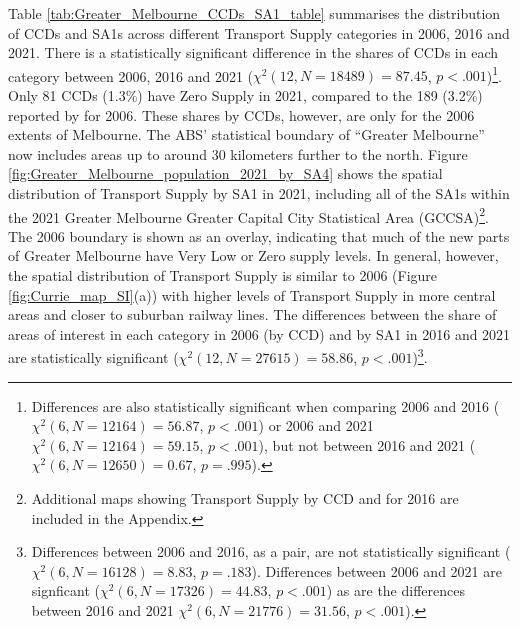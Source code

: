 \documentclass[preprint, 3p,
authoryear]{elsarticle} %
\begin{document}
Table \ref{tab:Greater_Melbourne_CCDs_SA1_table} summarises the
distribution of CCDs and SA1s across different Transport Supply
categories in 2006, 2016 and 2021. There is a statistically significant
difference in the shares of CCDs in each category between 2006, 2016 and
2021 (\(\chi^2(12, N = 18489) = 87.45\), \(p < .001\))\footnote{Differences
  are also statistically significant when comparing 2006 and 2016
  (\(\chi^2(6, N = 12164) = 56.87\), \(p < .001\)) or 2006 and 2021
  \(\chi^2(6, N = 12164) = 59.15\), \(p < .001\)), but not between 2016
  and 2021 (\(\chi^2(6, N = 12650) = 0.67\), \(p = .995\)).}. Only 81
CCDs (1.3\%) have Zero Supply in 2021, compared to the 189 (3.2\%)
reported by \citet{currie2010identifying} for 2006. These shares by
CCDs, however, are only for the 2006 extents of Melbourne. The ABS'
statistical boundary of ``Greater Melbourne'' now includes areas up to
around 30 kilometers further to the north. Figure
\ref{fig:Greater_Melbourne_population_2021_by_SA4} shows the spatial
distribution of Transport Supply by SA1 in 2021, including all of the
SA1s within the 2021 Greater Melbourne Greater Capital City Statistical
Area (GCCSA)\footnote{Additional maps showing Transport Supply by CCD
  and for 2016 are included in the Appendix.}. The 2006 boundary is
shown as an overlay, indicating that much of the new parts of Greater
Melbourne have Very Low or Zero supply levels. In general, however, the
spatial distribution of Transport Supply is similar to 2006 (Figure
\ref{fig:Currie_map_SI}(a)) with higher levels of Transport Supply in
more central areas and closer to suburban railway lines. The differences
between the share of areas of interest in each category in 2006 (by CCD)
and by SA1 in 2016 and 2021 are statistically significant
(\(\chi^2(12, N = 27615) = 58.86\), \(p < .001\))\footnote{Differences
  between 2006 and 2016, as a pair, are not statistically significant
  (\(\chi^2(6, N = 16128) = 8.83\), \(p = .183\)). Differences between
  2006 and 2021 are signficant (\(\chi^2(6, N = 17326) = 44.83\),
  \(p < .001\)) as are the differences between 2016 and 2021
  \(\chi^2(6, N = 21776) = 31.56\), \(p < .001\)).}.
\end{document}
